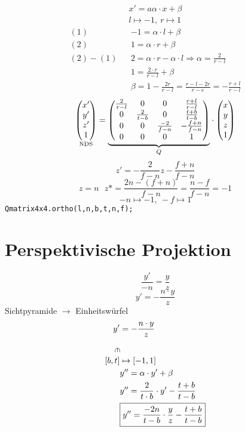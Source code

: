 \begin{align*}
x' = a\alpha \cdot x + \beta\\
l \mapsto -1, ~ r\mapsto 1
\end{align*}
\begin{align*}
(1)&&-1 = \alpha\cdot l + \beta\\
(2)&& 1 = \alpha\cdot r + \beta\\
\hline
(2) - (1)&& 2 = \alpha\cdot r -\alpha\cdot l \Rightarrow \alpha = \frac{2}{r-l}\\
&&1 = \frac{2\cdot r}{r - l}+\beta\\
&&\beta = 1 - \frac{2r}{r-l} = \frac{r-l-2r}{r-e} = -\frac{r+l}{r-l}
\end{align*}
\[ \underset{\text{NDS}}{\begin{pmatrix}x'\\y'\\z'\\1\end{pmatrix}} = \underset{Q}{\underbrace{\begin{pmatrix}\frac{2}{r-l}&0&0&\frac{r+l}{r-l}\\0&\frac{2}{t-b}&0&\frac{t+b}{t-b}\\0&0&\frac{-2}{f-n}&-\frac{f+n}{f-n}\\0&0&0&1   \end{pmatrix}}}\cdot\begin{pmatrix}x\\y\\z\\1\end{pmatrix} \]
\[  z' = -\frac{2}{f-n}z - \frac{f+n}{f-n}  \]
\[ z=n~~~z* = \frac{2n-(f+n)}{f-n} = \frac{n-f}{f-n} = -1 \]
\[ -n\mapsto -1,~-f\mapsto 1\]
\texttt{Qmatrix4x4.ortho(l,n,b,t,n,f);}
\section{Perspektivische Projektion}
\[ \frac{y'}{-n} = \frac{y}{z} \]
\[ y' = - \frac{n\cdot y}{z} \]
Sichtpyramide $\rightarrow$ Einheitswürfel
\begin{align*}
y'&=-\frac{n\cdot y}{z}\\
\rotatebox{-90}{$\in$}& \\
[b,t]&\mapsto[-1,1]\\
&y'' = \alpha\cdot y' + \beta\\
&y'' = \frac{2}{t\cdot b}\cdot y' - \frac{t+b}{t-b}\\
&\boxed{y'' = \frac{-2n}{t-b}\cdot \frac{y}{z} - \frac{t+b}{t-b} }
\end{align*}

